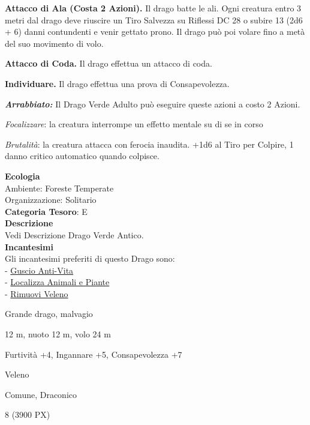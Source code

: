 \begin{multicols}{2}
{\textbf{Attacco di Ala (Costa 2 Azioni).} Il drago batte le ali. Ogni creatura entro 3 metri dal drago deve riuscire un Tiro Salvezza su Riflessi DC 28 o subire 13 (2d6 + 6) danni contundenti e venir gettato prono. Il drago può poi volare fino a metà del suo movimento di volo.

\textbf{Attacco di Coda.} Il drago effettua un attacco di coda.

\textbf{Individuare.} Il drago effettua una prova di Consapevolezza.

\emph{\textbf{Arrabbiato:}} Il Drago Verde Adulto può eseguire queste azioni a costo 2 Azioni.

\emph{Focalizzare}: la creatura interrompe un effetto mentale su di se in corso

\emph{Brutalità}: la creatura attacca con ferocia inaudita. +1d6 al Tiro per Colpire, 1 danno critico automatico quando colpisce.

\textbf{Ecologia}\\
Ambiente: Foreste Temperate\\
Organizzazione: Solitario\\
\textbf{Categoria Tesoro}: E\\
\textbf{Descrizione}\\
Vedi Descrizione Drago Verde Antico.\\
\textbf{Incantesimi}\\
Gli incantesimi preferiti di questo Drago sono:\\
- \hyperlink{Guscio Anti-Vita}{Guscio Anti-Vita}\\
- \hyperlink{Localizza Animali e Piante}{Localizza Animali e Piante}\\
- \hyperlink{Rimuovi Veleno}{Rimuovi Veleno}

\begin{description}[noitemsep, topsep=0pt, parsep=0pt, partopsep=0pt, itemsep=1pt, leftmargin=2.35cm,  labelwidth=2.2cm, itemindent=0cm, listparindent=0pt] %
\setlength{\baselineskip}{10pt}
\item[\textbf{Taglia/Tipo}] Grande drago, malvagio
\item[\textbf{Caratt.}] 
\item[\textbf{Punti Ferita}] 
\item[\textbf{Movimento}] 12 m, nuoto 12 m, volo 24 m
\item[\textbf{Tiri Salvez.}] 
\item[\textbf{Comp.}] Furtività +4, Ingannare +5, Consapevolezza +7
\item[\textbf{Imm. Danni}] Veleno
\item[\textbf{Sensi}] 
\item[\textbf{Linguaggi}] Comune, Draconico
\item[\textbf{Sfida}] 8 (3900 PX)
\end{description}
\smallskip

}
\end{multicols}
